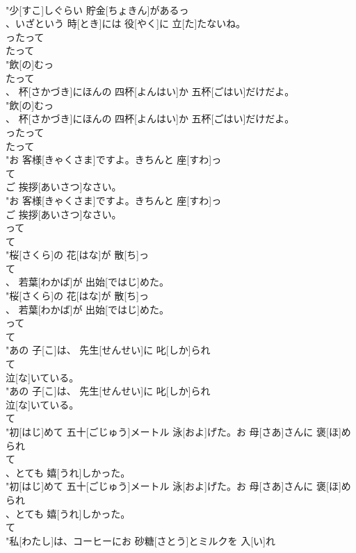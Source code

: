 \documentclass[8pt]{extreport}
\begin{document}
\begin{CJK}{UTF8}{min}
\\	"少[すこ]しぐらい 貯金[ちょきん]があるっ
\\	、いざという 時[とき]には 役[やく]に 立[た]たないね。
\\	ったって	
\\	たって
\\	"飲[の]むっ
\\	たって
\\	、 杯[さかづき]にほんの 四杯[よんはい]か 五杯[ごはい]だけだよ。
\\	"飲[の]むっ
\\	、 杯[さかづき]にほんの 四杯[よんはい]か 五杯[ごはい]だけだよ。
\\	ったって	
\\	たって
\\	"お 客様[きゃくさま]ですよ。きちんと 座[すわ]っ
\\	て
\\	ご 挨拶[あいさつ]なさい。
\\	"お 客様[きゃくさま]ですよ。きちんと 座[すわ]っ
\\	ご 挨拶[あいさつ]なさい。
\\	って 
\\	て
\\	"桜[さくら]の 花[はな]が 散[ち]っ
\\	て
\\	、 若葉[わかば]が 出始[ではじ]めた。
\\	"桜[さくら]の 花[はな]が 散[ち]っ
\\	、 若葉[わかば]が 出始[ではじ]めた。
\\	って 
\\	て
\\	"あの 子[こ]は、 先生[せんせい]に 叱[しか]られ
\\	て
\\	泣[な]いている。
\\	"あの 子[こ]は、 先生[せんせい]に 叱[しか]られ
\\	泣[な]いている。
\\	て
\\	"初[はじ]めて 五十[ごじゅう]メートル 泳[およ]げた。お 母[さあ]さんに 褒[ほ]められ
\\	て
\\	、とても 嬉[うれ]しかった。
\\	"初[はじ]めて 五十[ごじゅう]メートル 泳[およ]げた。お 母[さあ]さんに 褒[ほ]められ
\\	、とても 嬉[うれ]しかった。
\\	て
\\	"私[わたし]は、コーヒーにお 砂糖[さとう]とミルクを 入[い]れ

\end{CJK}
\end{document}
